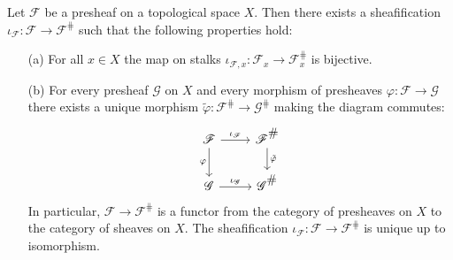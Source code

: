 \begin{proposition}\label{sheaf sheafification construction}
Let $\mathscr{F}$ be a presheaf on a topological space $X$. Then there exists a sheafification $\iota_{\mathscr{F}}:\mathscr{F}\to\mathscr{F}^{\hash}$ such that the following properties hold:
\begin{itemize}
\item[(a)] For all $x\in X$ the map on stalks $\iota_{\mathscr{F},x}:\mathscr{F}_x\to\mathscr{F}^{\hash}_x$ is bijective.
\item[(b)] For every presheaf $\mathscr{G}$ on $X$ and every morphism of presheaves $\varphi:\mathscr{F}\to\mathscr{G}$ there exists
a unique morphism $\tilde{\varphi}:\mathscr{F}^{\hash}\to\mathscr{G}^{\hash}$ making the diagram commutes:
\begin{equation}\label{sheafification-1}
\begin{tikzcd}
\mathscr{F}\ar[r,"\iota_{\mathscr{F}}"]\ar[d,swap,"\varphi"]&\mathscr{F}^{\hash}\ar[d,"\tilde{\varphi}"]\\
\mathscr{G}\ar[r,"\iota_{\mathscr{G}}"]&\mathscr{G}^{\hash}
\end{tikzcd}
\end{equation}
In particular, $\mathscr{F}\to\mathscr{F}^{\hash}$ is a functor from the category of presheaves on $X$ to the category of sheaves on $X$. The sheafification $\iota_{\mathscr{F}}:\mathscr{F}\to\mathscr{F}^{\hash}$ is unique up to isomorphism. 
\end{itemize}
\end{proposition}
